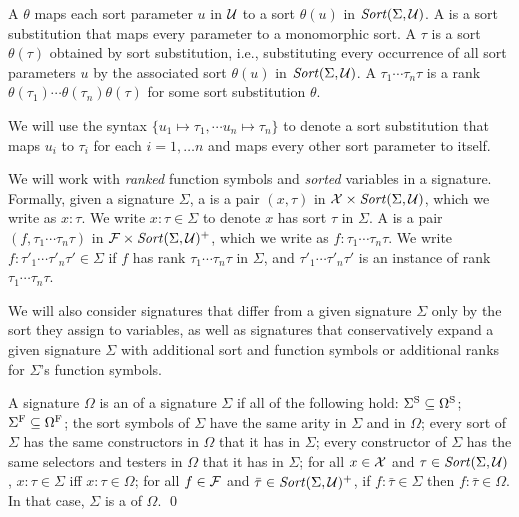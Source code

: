 \begin{definition}
A  $\theta$
maps each sort parameter $u$ in $\mathcal{U}$ to a sort $\theta(u)$ in $\mathit{Sort}(\Sigma,\mathcal{U})$.
A  is a sort substitution that maps every parameter
to a monomorphic sort.
A  $\tau$ is a sort $\theta(\tau)$ obtained
by sort substitution, i.e.,
substituting every occurrence of all sort parameters $u$ by the associated sort
$\theta(u)$ in $\mathit{Sort}(\Sigma,\mathcal{U})$.
A  $\tau_1\cdots\tau_n \tau$ is a rank
$\theta(\tau_1)\cdots\theta(\tau_n)\theta(\tau)$ for some sort substitution
$\theta$.
\end{definition}
We will use the syntax $\{u_1 \mapsto \tau_1, \cdots u_n \mapsto \tau_n \}$
to denote a sort substitution that maps $u_i$ to $\tau_i$ for each $i=1,\dots n$
and maps every other sort parameter to itself.

We will work with \emph{ranked} function symbols and \emph{sorted} variables
in a signature.
Formally,
given a signature $\Sigma$,
a  is 
a pair $(x,\tau)$ in $\mathcal{X} \times \mathit{Sort}(\Sigma, \mathcal{U})$,
which we write as $x{:}\tau$.
We write $x{:}\tau \in \Sigma$
to denote $x$ has sort $\tau$ in $\Sigma$.
A  is 
a pair $(f, \tau_1\cdots\tau_n\tau)$ in $\mathcal{F} \times \mathit{Sort}(\Sigma, \mathcal{U})^+$,
which we write as $f{:}\tau_1\cdots\tau_n\tau$.
We write  $f{:}\tau'_1\cdots\tau'_n\tau' \in \Sigma$
if $f$ has rank $\tau_1\cdots\tau_n\tau$ in $\Sigma$, and
$\tau'_1\cdots\tau'_n\tau'$ is an instance of rank $\tau_1\cdots\tau_n\tau$.

We will also consider signatures that differ from a given signature $\Sigma$
only by the sort they assign to variables,
as well as signatures that conservatively expand a given signature $\Sigma$
with additional sort and function symbols or additional ranks 
for $\Sigma$'s function symbols.

\begin{definition}[Signature expansions] 

A signature $\Omega$ is an  of a signature $\Sigma$
if all of the following hold:
$\Sigma^\mathrm{S} \subseteq \Omega^\mathrm{S}$;
$\Sigma^\mathrm{F} \subseteq \Omega^\mathrm{F}$;
the sort symbols of $\Sigma$ have the same arity in $\Sigma$ and in $\Omega$;
every sort of $\Sigma$ has the same constructors in $\Omega$ that it has in $\Sigma$;
every constructor of $\Sigma$ has the same selectors and testers in $\Omega$ 
that it has in $\Sigma$;
for all $x \in \mathcal{X}$ and $\tau \in \mathit{Sort}(\Sigma, \mathcal{U})$,
$x{:}\tau \in \Sigma$ iff $x{:}\tau \in \Omega$;
for all $f \in \mathcal{F}$ and $\bar{\tau} \in \mathit{Sort}(\Sigma, \mathcal{U})^+$,
if $f{:}\bar{\tau} \in \Sigma$ then $f{:}\bar{\tau} \in \Omega$.
In that case, $\Sigma$ is a  of $\Omega$.
\qed
\end{definition}


